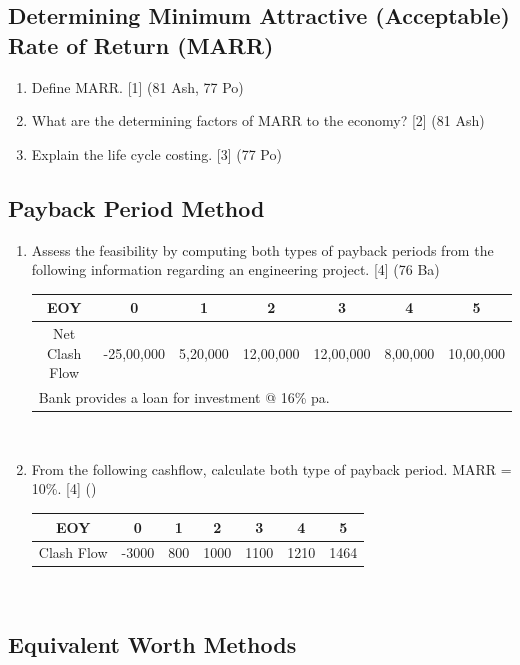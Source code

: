 \documentclass[12pt]{article}
\begin{document}
\subsection{Determining Minimum Attractive (Acceptable) Rate of Return (MARR)}
\begin{enumerate}[noitemsep, topsep = 0pt]
	\item Define MARR. \hfill [1] (81 Ash, 77 Po)
	
	\item What are the determining factors of MARR to the economy? \hfill [2] (81 Ash)
	
	\item Explain the life cycle costing. \hfill [3] (77 Po)
\end{enumerate}

\subsection{Payback Period Method}
\begin{enumerate}[noitemsep, topsep = 0pt]
	\item Assess the feasibility by computing both types of payback periods from the following information regarding an engineering project. \hfill [4] (76 Ba)\\
	\begin{tabular}{|c|c|c|c|c|c|c|}
		\hline
		EOY & 0 & 1 & 2 & 3 & 4 & 5\\ \hline
		Net Clash Flow & -25,00,000 & 5,20,000 & 12,00,000 & 12,00,000 & 8,00,000 & 10,00,000\\ \hline
		\multicolumn{7}{|l|}{Bank provides a loan for investment @ 16\% pa.}\\ \hline
	\end{tabular}\\[0pt]

	\item From the following cashflow, calculate both type of payback period. MARR = 10\%. \hfill [4] ()
	\begin{tabular}{|c|c|c|c|c|c|c|}
		\hline
		EOY & 0 & 1 & 2 & 3 & 4 & 5\\ \hline
		Clash Flow & -3000 & 800 & 1000 & 1100 & 1210 & 1464\\ 
		\hline
	\end{tabular}\\[0pt]
\end{enumerate}

\subsection{Equivalent Worth Methods}
\end{document}
